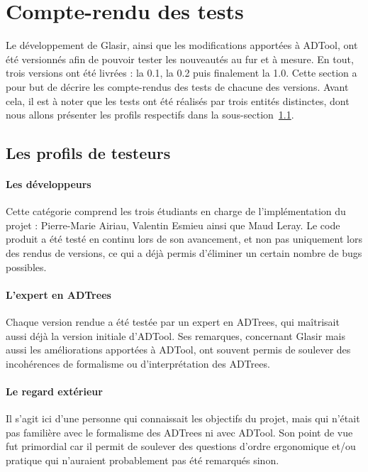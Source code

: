 \section{Compte-rendu des tests}
\label{sec:cr_tests}

Le développement de Glasir, ainsi que les modifications apportées à ADTool, ont été versionnés afin de pouvoir tester les nouveautés au fur et à mesure. En tout, trois versions ont été livrées : la 0.1, la 0.2 puis finalement la 1.0. Cette section a pour but de décrire les compte-rendus des tests de chacune des versions. Avant cela, il est à noter que les tests ont été réalisés par trois entités distinctes, dont nous allons présenter les profils respectifs dans la {\sc sous-section}~\ref{subsec:testeurs}.

\subsection{Les profils de testeurs}
\label{subsec:testeurs}

\paragraph{Les développeurs} Cette catégorie comprend les trois étudiants en charge de l'implémentation du projet : Pierre-Marie {\sc Airiau}, Valentin {\sc Esmieu} ainsi que Maud {\sc Leray}. Le code produit a été testé en continu lors de son avancement, et non pas uniquement lors des rendus de versions, ce qui a déjà permis d'éliminer un certain nombre de \og bugs \fg{} possibles.

\paragraph{L'expert en ADTrees} Chaque version rendue a été testée par un expert en ADTrees, qui maîtrisait aussi déjà la version initiale d'ADTool. Ses remarques, concernant Glasir mais aussi les améliorations apportées à ADTool, ont souvent permis de soulever des incohérences de formalisme ou d'interprétation des ADTrees.

\paragraph{Le regard extérieur} Il s'agit ici d'une personne qui connaissait les objectifs du projet, mais qui n'était pas familière avec le formalisme des ADTrees ni avec ADTool. Son point de vue fut primordial car il permit de soulever des questions d'ordre ergonomique et/ou pratique qui n'auraient probablement pas été remarqués sinon.

